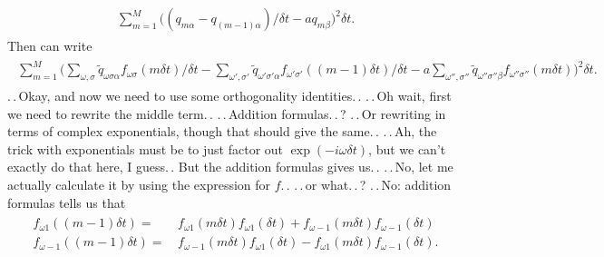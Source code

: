 \documentclass{report}
\begin{document}
\begin{align}
\begin{aligned}
	\sum_{m=1}^{M} 
		\big( 
			(q_{m \alpha} - q_{(m-1) \alpha}) / \delta t - 
			a q_{m \beta} 
		\big)^2 
		\delta t.
\end{aligned}
\end{align}
Then can write
\begin{align}
\begin{aligned}
	\sum_{m=1}^{M}
		\bigg( 
			\sum_{\omega, \sigma} 
				\tilde q_{\omega\sigma\alpha}
				f_{\omega \sigma}(m\delta t) 
				/ \delta t 
			- 
			\sum_{\omega', \sigma'} 
				\tilde q_{\omega'\sigma'\alpha}
				f_{\omega' \sigma'}((m-1) \delta t) 
			 	/ \delta t 
			- 
			a \sum_{\omega'', \sigma''} 
				\tilde q_{\omega''\sigma''\beta}
				f_{\omega'' \sigma''}(m \delta t) 
		\bigg)^2 
		\delta t.
	\label{3.44}
\end{aligned}
\end{align}
.\,.\,Okay, and now we need to use some orthogonality identities.\,. 
.\,.\,Oh wait, first we need to rewrite the middle term.\,. .\,.\,Addition formulas.\,.\,? .\,.\,Or rewriting in terms of complex exponentials, though that should give the same.\,. .\,.\,Ah, the trick with exponentials must be to just factor out $\exp(-i \omega \delta t)$, but we can't exactly do that here, I guess.\,. But the addition formulas gives us.\,. .\,.\,No, let me actually calculate it by using the expression for $f$.\,. .\,.\,or what.\,.\,? .\,.\,No: addition formulas tells us that
\begin{align}
\begin{aligned}
	f_{\omega 1}((m-1)\delta t) =&\, 
		f_{\omega 1}(m \delta t) f_{\omega 1}(\delta t) +
		f_{\omega -1}(m \delta t) f_{\omega -1}(\delta t) \\
	f_{\omega -1}((m-1)\delta t) =&\, 
		f_{\omega -1}(m \delta t) f_{\omega 1}(\delta t) -
		f_{\omega 1}(m \delta t) f_{\omega -1}(\delta t).
\end{aligned}
\end{align}
\end{document}
